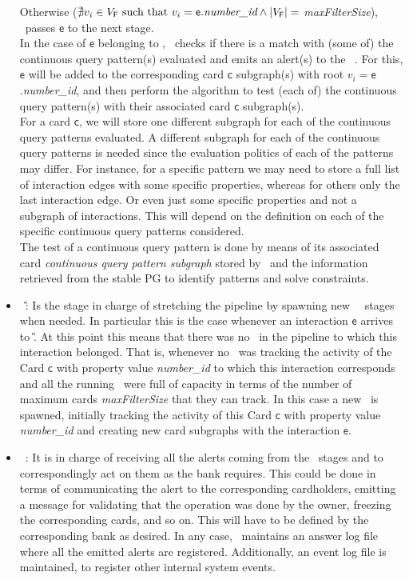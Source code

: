 \begin{itemize}
    Otherwise ($\nexists v_i \in V_{\mathsf{F}} \text{ such that } v_i = \mathsf{e}.\emph{number\_id} \land |V_{\mathsf{F}}| = $ \emph{maxFilterSize}), \F\ passes $\mathsf{e}$ to the next stage.\\

    In the case of $\mathsf{e}$ belonging to \F, \F\ checks if there is a match with (some of) the continuous query pattern(s) evaluated and emits an alert(s) to the \sink\ \Sk. For this, $\mathsf{e}$ will be added to the corresponding card $\mathsf{c}$ subgraph(s) with root $v_i =\mathsf{e}$.\emph{number\_id}, and then perform the algorithm to test (each of) the continuous query pattern(s) with their associated card $\mathsf{c}$ subgraph(s).\\ 

    For a card $\mathsf{c}$, we will store one different subgraph for each of the continuous query patterns evaluated. A different subgraph for each of the continuous query patterns is needed since the evaluation politics of each of the patterns may differ. For instance, for a specific pattern we may need to store a full list of interaction edges with some specific properties, whereas for others only the last interaction edge. Or even just some specific properties and not a subgraph of interactions. This will depend on the definition on each of the specific continuous query patterns considered.\\

    The test of a continuous query pattern is done by means of its associated card \emph{continuous query pattern subgraph} stored by \F\ and the information retrieved from the stable PG to identify patterns and solve constraints.
    
    \item \generator\ \G: Is the stage in charge of stretching the pipeline by spawning new \filter\ \F\ stages when needed. In particular this is the case whenever an interaction $\mathsf{e}$ arrives to \G. At this point this means that there was no \F\ in the pipeline to which this interaction belonged. That is, whenever no \F\ was tracking the activity of the Card $\mathsf{c}$ with property value \emph{number\_id} to which this interaction corresponds and all the running \F\ were full of capacity in terms of the number of maximum cards \emph{maxFilterSize} that they can track. In this case a new \F\ is spawned, initially tracking the activity of this Card $\mathsf{c}$ with property value \emph{number\_id} and creating new card subgraphs with the interaction $\mathsf{e}$. 
    \item \sink\ \Sk: It is in charge of receiving all the alerts coming from the \filter\ stages and to correspondingly act on them as the bank requires. This could be done in terms of communicating the alert to the corresponding cardholders, emitting a message for validating that the operation was done by the owner, freezing the corresponding cards, and so on. This will have to be defined by the corresponding bank as desired. In any case, \Sk\ maintains an answer log file where all the emitted alerts are registered. Additionally, an event log file is maintained, to register other internal system events.
\end{itemize}

